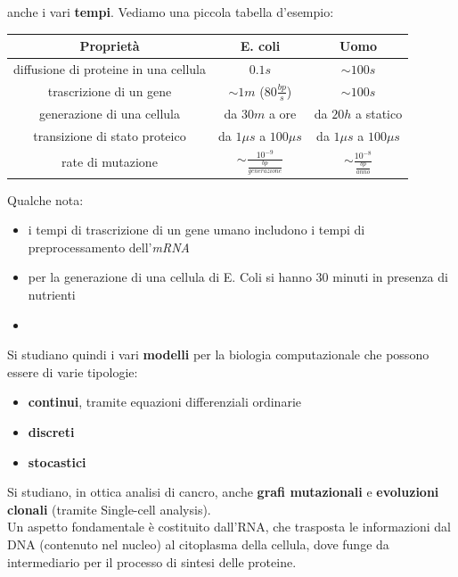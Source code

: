 \documentclass[a4paper,12pt, oneside]{book}
\begin{document}
anche i vari \textbf{tempi}. Vediamo una piccola tabella d'esempio:
\begin{table}[H]
  \small
  \centering
  \begin{tabular}{c|c|c}
    \textbf{Proprietà} & \textbf{E. coli} & \textbf{Uomo}\\
    \hline
    \hline
    diffusione di proteine in una cellula & $0.1 s$ & $\sim 100 s$\\
    \hline
    trascrizione di un gene & $\sim 1m$ ($80\frac{bp}{s}$) & $\sim 100 s$\\
    \hline
    generazione di una cellula & da $30 m$ a ore & da $20h$ a statico\\
    \hline
    transizione di stato proteico & da $1\mu s$ a $100\mu s$
                                          & da $1\mu s$ a $100\mu s$\\
    \hline
    rate di mutazione & $\sim \frac{10^{-9}}{\frac{bp}{generazione}}$
                                      & $\sim \frac{10^{-8}}{\frac{bp}{anno}}$\\
  \end{tabular}
\end{table}
Qualche nota:
\begin{itemize}
  \item i tempi di trascrizione di un gene umano includono i tempi di
  preprocessamento dell'\textit{mRNA}
  \item per la generazione di una cellula di E. Coli si hanno 30 minuti in
  presenza di nutrienti
  \item 
\end{itemize}
Si studiano quindi i vari \textbf{modelli} per la biologia computazionale che
possono essere di varie tipologie:
\begin{itemize}
  \item \textbf{continui}, tramite equazioni differenziali ordinarie
  \item \textbf{discreti}
  \item \textbf{stocastici}
\end{itemize}
Si studiano, in ottica analisi di cancro, anche \textbf{grafi mutazionali} e
\textbf{evoluzioni clonali} (tramite Single-cell analysis).\\
Un aspetto fondamentale è costituito dall'RNA, che trasposta le informazioni dal
DNA (contenuto nel nucleo) al citoplasma della cellula, dove funge da
intermediario per il processo di sintesi delle proteine.
\end{document}
